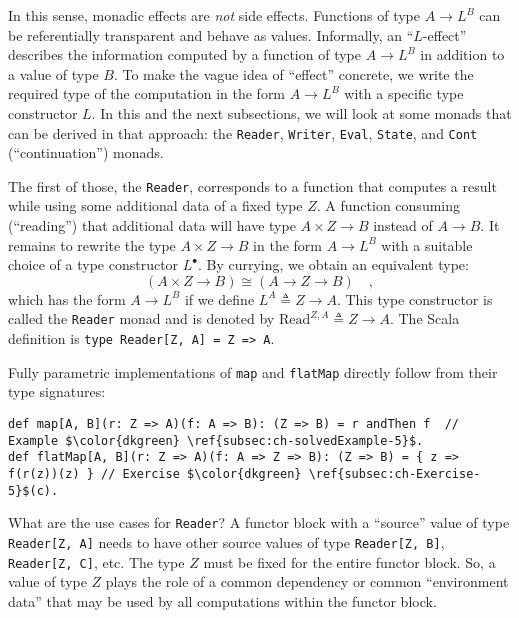 In this sense, monadic effects are \emph{not} side effects.
Functions of type $A\rightarrow L^{B}$ can be referentially transparent
and behave as values. Informally, an \textsf{``}$L$-effect\textsf{''}
describes the information computed by a function of type $A\rightarrow L^{B}$
in addition to a value of type $B$. To make the vague idea of \textsf{``}effect\textsf{''}
concrete, we write the required type of the computation in the form
$A\rightarrow L^{B}$ with a specific type constructor $L$. In this
and the next subsections, we will look at some monads that can be
derived in that approach: the \lstinline!Reader!, \lstinline!Writer!,
\lstinline!Eval!, \lstinline!State!, and \lstinline!Cont! (\textsf{``}continuation\textsf{''})
monads.

The first of those, the \lstinline!Reader!, corresponds to a function
that computes a result while using some additional data of a fixed
type $Z$. A function consuming (\textsf{``}reading\textsf{''}) that additional data
will have type $A\times Z\rightarrow B$ instead of $A\rightarrow B$.
It remains to rewrite the type $A\times Z\rightarrow B$ in the form
$A\rightarrow L^{B}$ with a suitable choice of a type constructor
$L^{\bullet}$. By currying, we obtain an equivalent type:
\[
(A\times Z\rightarrow B)\cong(A\rightarrow Z\rightarrow B)\quad,
\]
which has the form $A\rightarrow L^{B}$ if we define $L^{A}\triangleq Z\rightarrow A$.
This type constructor is called the \lstinline!Reader! monad
and is denoted by $\text{Read}^{Z,A}\triangleq Z\rightarrow A$. The
Scala definition is \lstinline!type Reader[Z, A] = Z => A!.

Fully parametric implementations of \lstinline!map! and \lstinline!flatMap!
directly follow from their type signatures:
\begin{lstlisting}[mathescape=true]
def map[A, B](r: Z => A)(f: A => B): (Z => B) = r andThen f  // Example $\color{dkgreen} \ref{subsec:ch-solvedExample-5}$.
def flatMap[A, B](r: Z => A)(f: A => Z => B): (Z => B) = { z => f(r(z))(z) } // Exercise $\color{dkgreen} \ref{subsec:ch-Exercise-5}$(c).
\end{lstlisting}

What are the use cases for \lstinline!Reader!? A functor block with
a \textsf{``}source\textsf{''} value of type \lstinline!Reader[Z, A]! needs to have
other source values of type \lstinline!Reader[Z, B]!, \lstinline!Reader[Z, C]!,
etc. The type $Z$ must be fixed for the entire functor block. So,
a value of type $Z$ plays the role of a common dependency or common
\textsf{``}environment data\textsf{''} that may be used by all computations within
the functor block.

